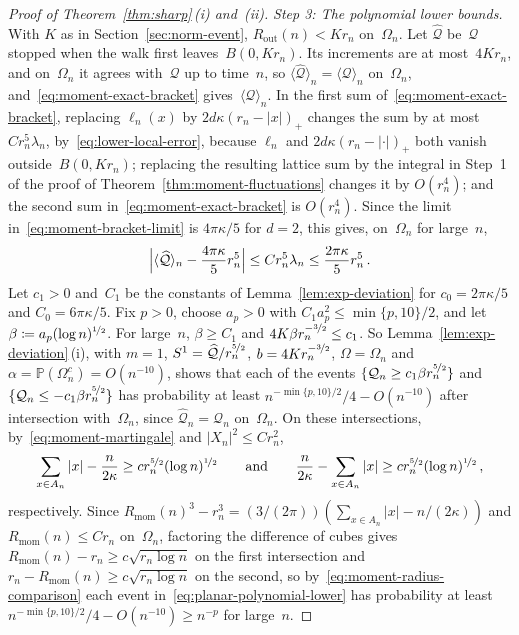 \documentclass[11pt]{amsart}
\theoremstyle{plain}
\theoremstyle{definition}
\renewcommand{\P}{\mathbb P}
\newcommand{\drift}{\kappa}
\newcommand{\nf}{\nicefrac}
\newcommand{\Rout}{R_{\mathrm{out}}}
\newcommand{\Rmom}{R_{\mathrm{mom}}}
\numberwithin{equation}{section}
\begin{document}
\begin{proof}[Proof of Theorem~\ref{thm:sharp}\,\textup{(i)} and~\textup{(ii)}]
\emph{Step 3: The polynomial lower bounds.} With $K$ as in Section~\ref{sec:norm-event}, $\Rout(n)<Kr_n$ on~$\Omega_n$. Let $\widehat{\mathcal Q}$ be~$\mathcal Q$ stopped when the walk first leaves~$B(0,Kr_n)$. Its increments are at most~$4Kr_n$, and on~$\Omega_n$ it agrees with~$\mathcal Q$ up to time~$n$, so $\langle\widehat{\mathcal Q}\rangle_n=\langle\mathcal Q\rangle_n$ on~$\Omega_n$, and~\eqref{eq:moment-exact-bracket} gives~$\langle\mathcal Q\rangle_n$. In the first sum of~\eqref{eq:moment-exact-bracket}, replacing $\ell_n(x)$ by $2d\drift(r_n-|x|)_+$ changes the sum by at most $Cr_n^5\lambda_n$, by~\eqref{eq:lower-local-error}, because $\ell_n$ and $2d\drift(r_n-|\cdot|)_+$ both vanish outside~$B(0,Kr_n)$; replacing the resulting lattice sum by the integral in Step~1 of the proof of Theorem~\ref{thm:moment-fluctuations} changes it by $O(r_n^4)$; and the second sum in~\eqref{eq:moment-exact-bracket} is $O(r_n^4)$. Since the limit in~\eqref{eq:moment-bracket-limit} is $4\pi\drift/5$ for $d=2$, this gives, on~$\Omega_n$ for large~$n$,
\begin{equation*}
\Bigl|\langle\widehat{\mathcal Q}\rangle_n-\frac{4\pi\drift}5r_n^5\Bigr|\leq Cr_n^5\lambda_n\leq\frac{2\pi\drift}5r_n^5\, .
\end{equation*}
Let $c_1>0$ and~$C_1$ be the constants of Lemma~\ref{lem:exp-deviation} for $c_0=2\pi\drift/5$ and $C_0=6\pi\drift/5$. Fix $p>0$, choose $a_p>0$ with $C_1a_p^2\leq\min\{p,10\}/2$, and let $\beta\coloneqq a_p(\log n)^{\nf12}$. For large~$n$, $\beta\geq C_1$ and $4K\beta r_n^{-\nf32}\leq c_1$. So Lemma~\ref{lem:exp-deviation}\,(i), with $m=1$, $S^1=\widehat{\mathcal Q}/r_n^{\nf52}$, $b=4Kr_n^{-\nf32}$, $\Omega=\Omega_n$ and $\alpha=\P(\Omega_n^c)=O(n^{-10})$, shows that each of the events $\{\mathcal Q_n\geq c_1\beta r_n^{\nf52}\}$ and $\{\mathcal Q_n\leq-c_1\beta r_n^{\nf52}\}$ has probability at least $n^{-\min\{p,10\}/2}/4-O(n^{-10})$ after intersection with~$\Omega_n$, since $\widehat{\mathcal Q}_n=\mathcal Q_n$ on~$\Omega_n$. On these intersections, by~\eqref{eq:moment-martingale} and $|X_n|^2\leq Cr_n^2$,
\begin{equation*}
\sum_{x\in A_n}|x|-\frac n{2\drift}\geq cr_n^{\nf52}(\log n)^{\nf12}
\qquad\text{and}\qquad
\frac n{2\drift}-\sum_{x\in A_n}|x|\geq cr_n^{\nf52}(\log n)^{\nf12}\, ,
\end{equation*}
respectively. Since $\Rmom(n)^3-r_n^3=(3/(2\pi))(\sum_{x\in A_n}|x|-n/(2\drift))$ and $\Rmom(n)\leq Cr_n$ on~$\Omega_n$, factoring the difference of cubes gives $\Rmom(n)-r_n\geq c\sqrt{r_n\log n}$ on the first intersection and $r_n-\Rmom(n)\geq c\sqrt{r_n\log n}$ on the second, so by~\eqref{eq:moment-radius-comparison} each event in~\eqref{eq:planar-polynomial-lower} has probability at least $n^{-\min\{p,10\}/2}/4-O(n^{-10})\geq n^{-p}$ for large~$n$.
\end{proof}
\end{document}
